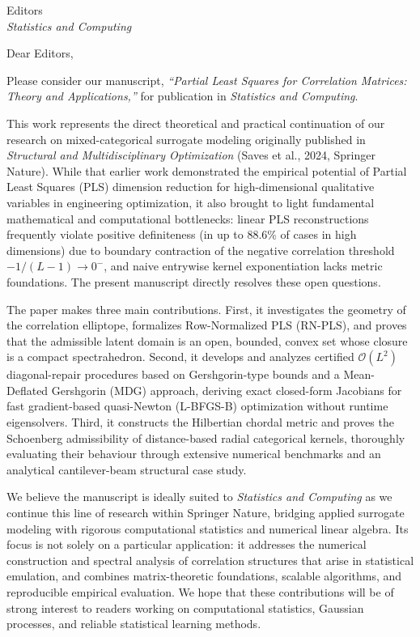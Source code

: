 \documentclass[11pt]{letter}
\begin{document}
\begin{letter}{Editors\\
\textit{Statistics and Computing}}

\opening{Dear Editors,}

Please consider our manuscript, \emph{``Partial Least Squares for Correlation Matrices: Theory and Applications,''} for publication in \textit{Statistics and Computing}.

This work represents the direct theoretical and practical continuation of our research on mixed-categorical surrogate modeling originally published in \textit{Structural and Multidisciplinary Optimization} (Saves et al., 2024, Springer Nature). While that earlier work demonstrated the empirical potential of Partial Least Squares (PLS) dimension reduction for high-dimensional qualitative variables in engineering optimization, it also brought to light fundamental mathematical and computational bottlenecks: linear PLS reconstructions frequently violate positive definiteness (in up to 88.6\% of cases in high dimensions) due to boundary contraction of the negative correlation threshold $-1/(L-1) \to 0^-$, and naive entrywise kernel exponentiation lacks metric foundations. The present manuscript directly resolves these open questions.

The paper makes three main contributions. First, it investigates the geometry of the correlation elliptope, formalizes Row-Normalized PLS (RN-PLS), and proves that the admissible latent domain is an open, bounded, convex set whose closure is a compact spectrahedron. Second, it develops and analyzes certified $\mathcal{O}(L^2)$ diagonal-repair procedures based on Gershgorin-type bounds and a Mean-Deflated Gershgorin (MDG) approach, deriving exact closed-form Jacobians for fast gradient-based quasi-Newton (L-BFGS-B) optimization without runtime eigensolvers. Third, it constructs the Hilbertian chordal metric and proves the Schoenberg admissibility of distance-based radial categorical kernels, thoroughly evaluating their behaviour through extensive numerical benchmarks and an analytical cantilever-beam structural case study.

We believe the manuscript is ideally suited to \textit{Statistics and Computing} as we continue this line of research within Springer Nature, bridging applied surrogate modeling with rigorous computational statistics and numerical linear algebra. Its focus is not solely on a particular application: it addresses the numerical construction and spectral analysis of correlation structures that arise in statistical emulation, and combines matrix-theoretic foundations, scalable algorithms, and reproducible empirical evaluation. We hope that these contributions will be of strong interest to readers working on computational statistics, Gaussian processes, and reliable statistical learning methods.


\end{letter}
\end{document}
